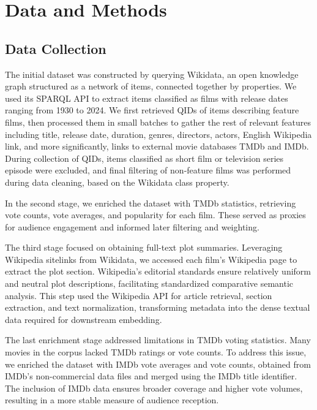 \documentclass{article}
\begin{document}
\section{Data and Methods}\label{sec:methods}

\subsection{Data Collection}

The initial dataset was constructed by querying Wikidata, an open knowledge graph structured as a network of items, connected together by properties. We used its SPARQL API to extract items classified as films with release dates ranging from 1930 to 2024.
We first retrieved QIDs of items describing feature films, then processed them in small batches to gather the rest of relevant features including title, release date, duration, genres, directors, actors, English Wikipedia link, and more significantly, links to external movie databases TMDb and IMDb. During collection of QIDs, items classified as short film or television series episode were excluded, and final filtering of non-feature films was performed during data cleaning, based on the Wikidata class property.

In the second stage, we enriched the dataset with TMDb statistics, retrieving vote counts, vote averages, and popularity for each film. These served as proxies for audience engagement and informed later filtering and weighting.

The third stage focused on obtaining full-text plot summaries. Leveraging Wikipedia sitelinks from Wikidata, we accessed each film's Wikipedia page to extract the plot section. Wikipedia's editorial standards ensure relatively uniform and neutral plot descriptions, facilitating standardized comparative semantic analysis. This step used the Wikipedia API for article retrieval, section extraction, and text normalization, transforming metadata into the dense textual data required for downstream embedding.

The last enrichment stage addressed limitations in TMDb voting statistics. Many movies in the corpus lacked TMDb ratings or vote counts. To address this issue, we enriched the dataset with IMDb vote averages and vote counts, obtained from IMDb's non-commercial data files and merged using the IMDb title identifier. The inclusion of IMDb data ensures broader coverage and higher vote volumes, resulting in a more stable measure of audience reception.
\end{document}
